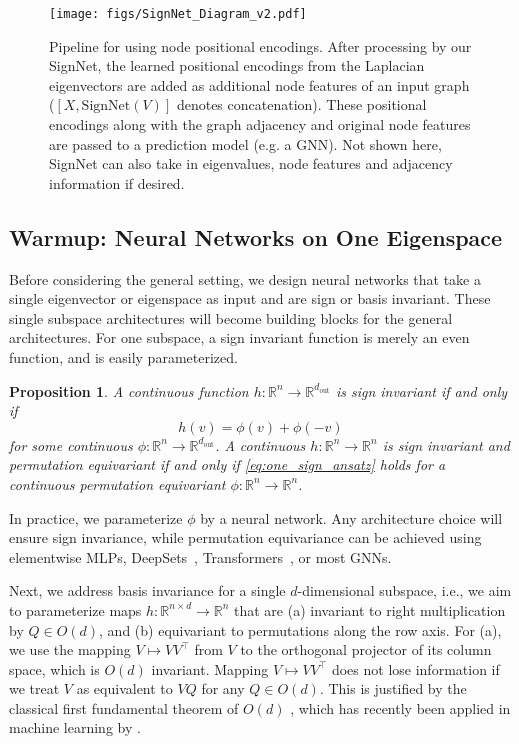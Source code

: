 \documentclass{article} \usepackage{iclr2023_conference,times}
\newcommand{\RR}{\mathbb R}
\newcommand{\mrm}[1]{\mathrm{#1}}
\newcommand{\dout}{d_{\mrm{out}}}
\newtheorem{proposition}{Proposition}
\begin{document}
\begin{figure}[ht]
    \centering
    \texttt{[image: figs/SignNet\_Diagram\_v2.pdf]}
    \caption{Pipeline for using node positional encodings. After processing by our SignNet, the learned positional encodings from the Laplacian eigenvectors are added as additional node features of an input graph ($[X, \mrm{SignNet}(V)]$ denotes concatenation).
    These positional encodings along with the graph adjacency and original node features are passed to a prediction model (e.g. a GNN).
    Not shown here, SignNet can also take in eigenvalues, node features and adjacency information if desired.}
    \label{fig:signnet_diagram}
\end{figure}

\subsection{Warmup: Neural Networks on One Eigenspace}\label{sec: warmup}

Before considering the general setting, we design neural networks that take a single eigenvector or eigenspace as input and are sign or basis invariant. These single subspace architectures will become building blocks for the general architectures. For one subspace, a sign invariant function is merely an even function, and is easily parameterized.
\begin{proposition}\label{prop:one_sign_invariant}
    A continuous function $h: \RR^n \to \RR^{\dout}$ is sign invariant if and only if
    \begin{equation}\label{eq:one_sign_ansatz}
     h(v) = \phi(v) + \phi(-v)   
    \end{equation}
    for some continuous $\phi: \RR^n \to \RR^{\dout}$. A continuous $h: \RR^n \to \RR^n$ is sign invariant and permutation equivariant if and only if \eqref{eq:one_sign_ansatz} holds for a continuous permutation equivariant $\phi: \RR^n \to \RR^n$.
\end{proposition}

In practice, we parameterize $\phi$ by a neural network. Any architecture choice will ensure sign invariance, while permutation equivariance can be achieved using elementwise MLPs, DeepSets~\citep{zaheer2017deep}, Transformers~\citep{vaswani2017attention}, or  most GNNs.

Next, we address basis invariance for a single $d$-dimensional subspace, i.e., we aim to parameterize maps $h: \mathbb{R}^{n \times d} \rightarrow \mathbb{R}^n$ that are (a) invariant to right multiplication by $Q \in O(d)$, and (b) equivariant to permutations along the row axis. For (a), we use the mapping $V \mapsto V V^\top$ from $V$ to the orthogonal projector of its column space, which is $O(d)$ invariant.
Mapping $V \mapsto VV^\top$ does not lose information if we treat $V$ as equivalent to $VQ$ for any $Q \in O(d)$. This is justified by the classical first fundamental theorem of $O(d)$ \citep{kraft1996classical}, which has recently been applied in machine learning by \cite{villar2021scalars}.
\end{document}
